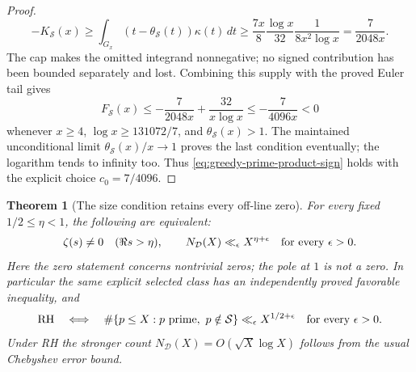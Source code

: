 \documentclass[11pt]{article}
\newtheorem{theorem}{Theorem}[section]
\theoremstyle{definition}
\begin{document}
\begin{proof}
\[
 -K_{\mathcal S}(x)
 \ge\int_{G_x}(t-\theta_{\mathcal S}(t))\kappa(t)\,dt
 \ge\frac{7x}{8}\frac{\log x}{32}\frac{1}{8x^2\log x}
 =\frac{7}{2048x}.
\]
The cap makes the omitted integrand nonnegative; no signed contribution
has been bounded separately and lost. Combining this supply with the
proved Euler tail gives
\[
 F_{\mathcal S}(x)
 \le-\frac{7}{2048x}+\frac{32}{x\log x}
 \le-\frac{7}{4096x}<0
\]
whenever \(x\ge4\), \(\log x\ge131072/7\), and
\(\theta_{\mathcal S}(x)>1\).
The maintained unconditional limit
\(\theta_{\mathcal S}(x)/x\to1\) proves the last condition eventually;
the logarithm tends to infinity too. Thus
\eqref{eq:greedy-prime-product-sign} holds with the explicit choice
\(c_0=7/4096\).
\end{proof}


\begin{theorem}[The size condition retains every off-line zero]
\label{thm:greedy-prime-RH-size}
For every fixed $1/2\le\eta<1$, the following are equivalent:
\[
 \zeta(s)\ne0\quad(\Re s>\eta),\qquad
 N_{\mathcal D}(X)\ll_\epsilon X^{\eta+\epsilon}
                         \quad\hbox{for every }\epsilon>0 .
\]
Here the zero statement concerns nontrivial zeros; the pole at $1$
is not a zero. In particular the same explicit selected class
has an independently proved favorable inequality, and
\begin{equation}
 \mathrm{RH}\quad\Longleftrightarrow\quad
 \#\{p\le X:p\ {\rm prime},\ p\notin\mathcal S\}
             \ll_\epsilon X^{1/2+\epsilon}
                   \quad\hbox{for every }\epsilon>0.
 \label{eq:greedy-prime-RH-size}
\end{equation}
Under RH the stronger count
$N_{\mathcal D}(X)=O(\sqrt X\log X)$ follows from the usual
Chebyshev error bound.
\end{theorem}
\end{document}
